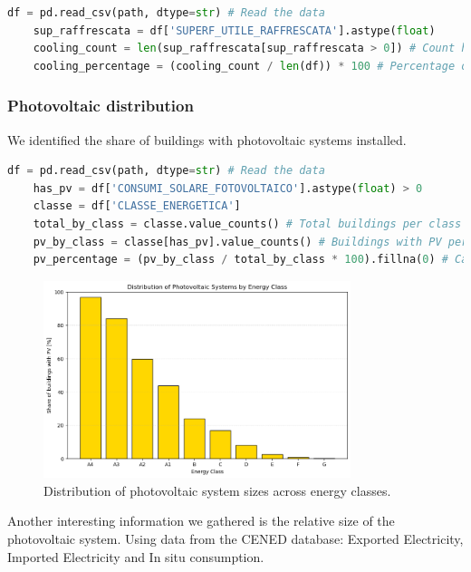 \begin{lstlisting}[language=python, caption={Code to extract cooling system data from the CENED database.}, label={lst:cooling_share}]
    df = pd.read_csv(path, dtype=str) # Read the data
    sup_raffrescata = df['SUPERF_UTILE_RAFFRESCATA'].astype(float)
    cooling_count = len(sup_raffrescata[sup_raffrescata > 0]) # Count how many buildings have cooling
    cooling_percentage = (cooling_count / len(df)) * 100 # Percentage of buildings with cooling
\end{lstlisting}

\subsubsection{Photovoltaic distribution}
We identified the share of buildings with photovoltaic systems installed.
\begin{lstlisting}[language=python, caption={Code to extract photovoltaic data from the CENED database.}, label={lst:photovoltaic_query}]
    df = pd.read_csv(path, dtype=str) # Read the data
    has_pv = df['CONSUMI_SOLARE_FOTOVOLTAICO'].astype(float) > 0
    classe = df['CLASSE_ENERGETICA']
    total_by_class = classe.value_counts() # Total buildings per class
    pv_by_class = classe[has_pv].value_counts() # Buildings with PV per class
    pv_percentage = (pv_by_class / total_by_class * 100).fillna(0) # Calculate percentage
\end{lstlisting}

\begin{figure}[H]
    \centering
    \includegraphics[width=0.8\textwidth]{figures/1_photovoltaic_distribution.png}
    \caption{Distribution of photovoltaic system sizes across energy classes.}
    \label{fig:photovoltaic_size_distribution}
\end{figure}

Another interesting information we gathered is the relative size of the photovoltaic system. 
Using data from the CENED database: Exported Electricity, Imported Electricity and In situ consumption.

